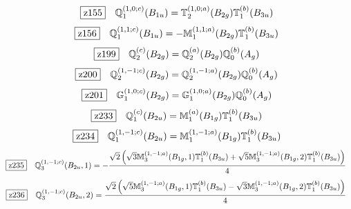 \documentclass[fleqn,10pt,landscape]{jsarticle}
\begin{document}
\begin{dmath*}
\hspace*{3mm}\fbox{z155}\quad \mathbb{Q}_{1}^{(1,0;c)}(B_{1u})=\mathbb{T}_{2}^{(1,0;a)}(B_{2g}) \mathbb{T}_{1}^{(b)}(B_{3u})
\end{dmath*}
\begin{dmath*}
\hspace*{3mm}\fbox{z156}\quad \mathbb{Q}_{1}^{(1,1;c)}(B_{1u})=- \mathbb{M}_{1}^{(1,1;a)}(B_{2g}) \mathbb{T}_{1}^{(b)}(B_{3u})
\end{dmath*}
\begin{dmath*}
\hspace*{3mm}\fbox{z199}\quad \mathbb{Q}_{2}^{(c)}(B_{2g})=\mathbb{Q}_{2}^{(a)}(B_{2g}) \mathbb{Q}_{0}^{(b)}(A_{g})
\end{dmath*}
\begin{dmath*}
\hspace*{3mm}\fbox{z200}\quad \mathbb{Q}_{2}^{(1,-1;c)}(B_{2g})=\mathbb{Q}_{2}^{(1,-1;a)}(B_{2g}) \mathbb{Q}_{0}^{(b)}(A_{g})
\end{dmath*}
\begin{dmath*}
\hspace*{3mm}\fbox{z201}\quad \mathbb{G}_{1}^{(1,0;c)}(B_{2g})=\mathbb{G}_{1}^{(1,0;a)}(B_{2g}) \mathbb{Q}_{0}^{(b)}(A_{g})
\end{dmath*}
\begin{dmath*}
\hspace*{3mm}\fbox{z233}\quad \mathbb{Q}_{1}^{(c)}(B_{2u})=\mathbb{M}_{1}^{(a)}(B_{1g}) \mathbb{T}_{1}^{(b)}(B_{3u})
\end{dmath*}
\begin{dmath*}
\hspace*{3mm}\fbox{z234}\quad \mathbb{Q}_{1}^{(1,-1;c)}(B_{2u})=\mathbb{M}_{1}^{(1,-1;a)}(B_{1g}) \mathbb{T}_{1}^{(b)}(B_{3u})
\end{dmath*}
\begin{dmath*}
\hspace*{3mm}\fbox{z235}\quad \mathbb{Q}_{3}^{(1,-1;c)}(B_{2u},1)=- \frac{\sqrt{2} \left(\sqrt{3} \mathbb{M}_{3}^{(1,-1;a)}(B_{1g},1) \mathbb{T}_{1}^{(b)}(B_{3u}) + \sqrt{5} \mathbb{M}_{3}^{(1,-1;a)}(B_{1g},2) \mathbb{T}_{1}^{(b)}(B_{3u})\right)}{4}
\end{dmath*}
\begin{dmath*}
\hspace*{3mm}\fbox{z236}\quad \mathbb{Q}_{3}^{(1,-1;c)}(B_{2u},2)=\frac{\sqrt{2} \left(\sqrt{5} \mathbb{M}_{3}^{(1,-1;a)}(B_{1g},1) \mathbb{T}_{1}^{(b)}(B_{3u}) - \sqrt{3} \mathbb{M}_{3}^{(1,-1;a)}(B_{1g},2) \mathbb{T}_{1}^{(b)}(B_{3u})\right)}{4}
\end{dmath*}
\end{document}
